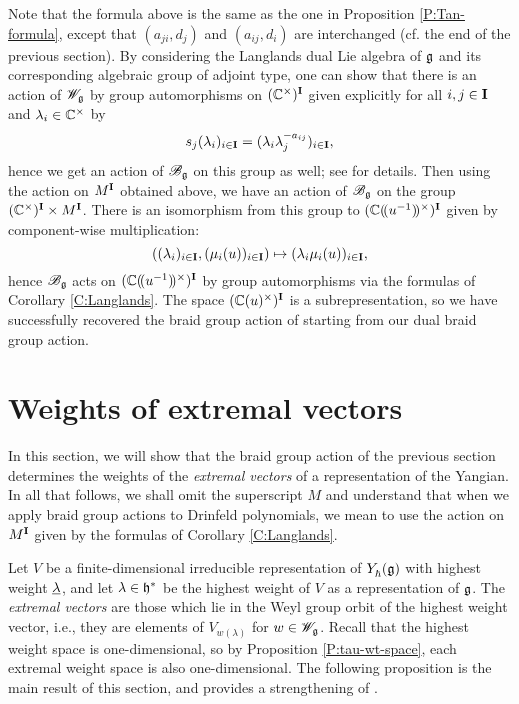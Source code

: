 Note that the formula above is the same as the one in Proposition \ref{P:Tan-formula}, except that $(a_{ji}, d_j)$ and $(a_{ij}, d_i)$ are interchanged (cf. the end of the previous section).
By considering the Langlands dual Lie algebra of $\mathfrak{g}$ and its corresponding algebraic group of adjoint type, one can show that there is an action of $\mathscr{W}_{\mathfrak{g}}$ by group automorphisms on $(\mathbb{C}^\times)^{\mathbf{I}}$ given explicitly for all $i,j\in\mathbf{I}$ and $\lambda_i\in\mathbb{C}^\times$ by
\[s_j(\lambda_i)_{i\in\mathbf{I}} = (\lambda_i\lambda_j^{-a_{ij}})_{i\in\mathbf{I}},\]
hence we get an action of $\mathscr{B}_{\mathfrak{g}}$ on this group as well; see \cite[Remark 4.6]{friesen_braid_2024} for details.
Then using the action on $M^{\mathbf{I}}$ obtained above, we have an action of $\mathscr{B}_{\mathfrak{g}}$ on the group $(\mathbb{C}^\times)^{\mathbf{I}}\times M^{\mathbf{I}}$.
There is an isomorphism from this group to $(\mathbb{C}(\!(u^{-1})\!)^\times)^{\mathbf{I}}$ given by component-wise multiplication:
\[((\lambda_i)_{i\in\mathbf{I}}, (\mu_i(u))_{i\in\mathbf{I}}) \mapsto (\lambda_i\mu_i(u))_{i\in\mathbf{I}},\]
hence $\mathscr{B}_{\mathfrak{g}}$ acts on $(\mathbb{C}(\!(u^{-1})\!)^\times)^{\mathbf{I}}$ by group automorphisms via the formulas of Corollary \ref{C:Langlands}.
The space $(\mathbb{C}(u)^\times)^{\mathbf{I}}$ is a subrepresentation, so we have successfully recovered the braid group action of \cite[Prop. 3.1]{tan_braid_2015} starting from our dual braid group action.


\section{Weights of extremal vectors}\label{sec:extremal-weights}

In this section, we will show that the braid group action of the previous section determines the weights of the \emph{extremal vectors} of a representation of the Yangian.
In all that follows, we shall omit the superscript $M$ and understand that when we apply braid group actions to Drinfeld polynomials, we mean to use the action on $M^{\mathbf{I}}$ given by the formulas of Corollary \ref{C:Langlands}.

Let $V$ be a finite-dimensional irreducible representation of $Y_\hbar^{}(\mathfrak{g})$ with highest weight $\underline{\lambda}$, and let $\lambda\in\mathfrak{h}^*$ be the highest weight of $V$ as a representation of $\mathfrak{g}$.
The \emph{extremal vectors} are those which lie in the Weyl group orbit of the highest weight vector, i.e., they are elements of $V_{w(\lambda)}$ for $w\in\mathscr{W}_{\mathfrak{g}}$.
Recall that the highest weight space is one-dimensional, so by Proposition \ref{P:tau-wt-space}, each extremal weight space is also one-dimensional.
The following proposition is the main result of this section, and provides a strengthening of \cite[Prop. 4.5]{tan_braid_2015}.

